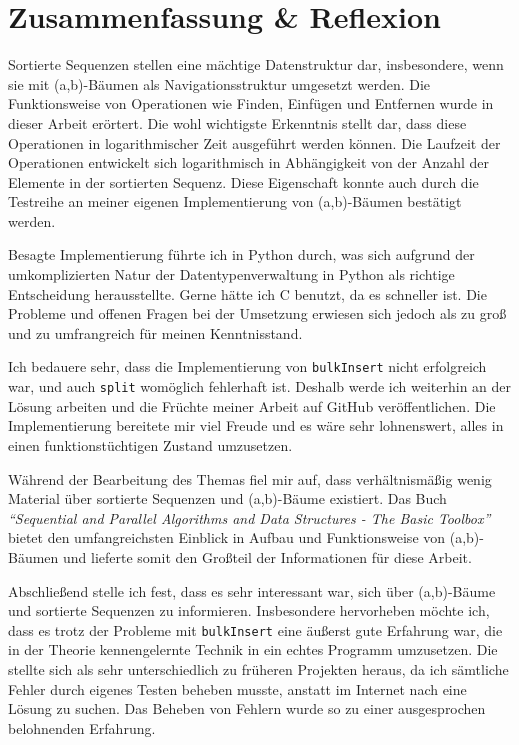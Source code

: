 \chapter{Zusammenfassung \& Reflexion}

Sortierte Sequenzen stellen eine mächtige Datenstruktur dar, insbesondere, wenn sie mit (a,b)-Bäumen als Navigationsstruktur umgesetzt werden. Die Funktionsweise von Operationen wie Finden, Einfügen und Entfernen wurde in dieser Arbeit erörtert. Die wohl wichtigste Erkenntnis stellt dar, dass diese Operationen in logarithmischer Zeit ausgeführt werden können. Die Laufzeit der Operationen entwickelt sich logarithmisch in Abhängigkeit von der Anzahl  der Elemente in der sortierten Sequenz. Diese Eigenschaft konnte auch durch die Testreihe an meiner eigenen Implementierung von (a,b)-Bäumen bestätigt werden.
\par
Besagte Implementierung führte ich in Python durch, was sich aufgrund der umkomplizierten Natur der Datentypenverwaltung in Python als richtige Entscheidung herausstellte. Gerne hätte ich C benutzt, da es schneller ist. Die Probleme und offenen Fragen bei der Umsetzung erwiesen sich jedoch als zu groß und zu umfrangreich für meinen Kenntnisstand.
\par
Ich bedauere sehr, dass die Implementierung von \texttt{bulkInsert} nicht erfolgreich war, und auch \texttt{split} womöglich fehlerhaft ist. Deshalb werde ich weiterhin an der Lösung arbeiten und die Früchte meiner Arbeit auf GitHub veröffentlichen. Die Implementierung bereitete mir viel Freude und es wäre sehr lohnenswert, alles in einen funktionstüchtigen Zustand umzusetzen.
\par
Während der Bearbeitung des Themas fiel mir auf, dass verhältnismäßig wenig Material über sortierte Sequenzen und (a,b)-Bäume existiert. Das Buch \textit{"`Sequential and Parallel Algorithms and Data Structures - The Basic Toolbox"'} \cite{Sanders:19} bietet den umfangreichsten Einblick in Aufbau und Funktionsweise von (a,b)-Bäumen und lieferte somit den Großteil der Informationen für diese Arbeit.
\par
Abschließend stelle ich fest, dass es sehr interessant war, sich über (a,b)-Bäume und sortierte Sequenzen zu informieren. Insbesondere hervorheben möchte ich, dass es trotz der Probleme mit \texttt{bulkInsert} eine äußerst gute Erfahrung war, die in der Theorie kennengelernte Technik in ein echtes Programm umzusetzen. Die stellte sich als sehr unterschiedlich zu früheren Projekten heraus, da ich sämtliche Fehler durch eigenes Testen beheben musste, anstatt im Internet nach eine Lösung zu suchen. Das Beheben von Fehlern wurde so zu einer ausgesprochen belohnenden Erfahrung.
